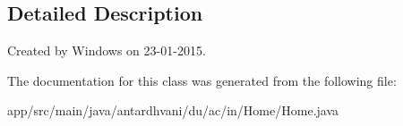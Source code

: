 \subsection{Detailed Description}
Created by Windows on 23-\/01-\/2015. 

The documentation for this class was generated from the following file\+:\begin{DoxyCompactItemize}
\item 
app/src/main/java/antardhvani/du/ac/in/\+Home/Home.\+java\end{DoxyCompactItemize}
